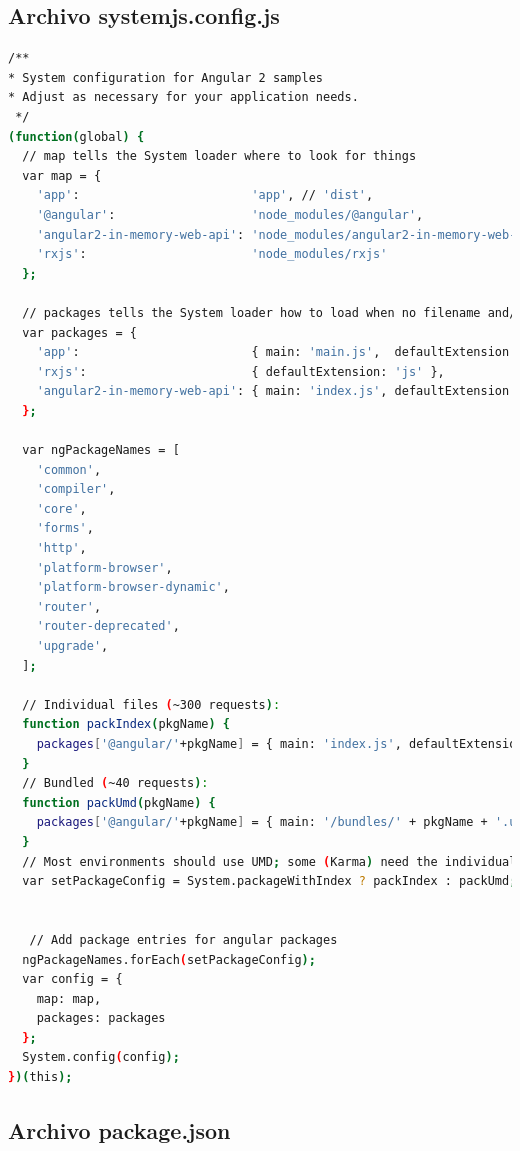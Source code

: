 \documentclass[12pt,twoside]{book}
\begin{document}
\subsection{Archivo systemjs.config.js}

\begin{lstlisting}[language=bash]
/**
* System configuration for Angular 2 samples
* Adjust as necessary for your application needs.
 */
(function(global) {
  // map tells the System loader where to look for things
  var map = {
    'app':                        'app', // 'dist',
    '@angular':                   'node_modules/@angular',
    'angular2-in-memory-web-api': 'node_modules/angular2-in-memory-web-api',
    'rxjs':                       'node_modules/rxjs'
  };
  
  // packages tells the System loader how to load when no filename and/or no extension
  var packages = {
    'app':                        { main: 'main.js',  defaultExtension: 'js' },
    'rxjs':                       { defaultExtension: 'js' },
    'angular2-in-memory-web-api': { main: 'index.js', defaultExtension: 'js' },
  };
  
  var ngPackageNames = [
    'common',
    'compiler',
    'core',
    'forms',
    'http',
    'platform-browser',
    'platform-browser-dynamic',
    'router',
    'router-deprecated',
    'upgrade',
  ];
  
  // Individual files (~300 requests):
  function packIndex(pkgName) {
    packages['@angular/'+pkgName] = { main: 'index.js', defaultExtension: 'js' };
  }
  // Bundled (~40 requests):
  function packUmd(pkgName) {
    packages['@angular/'+pkgName] = { main: '/bundles/' + pkgName + '.umd.js', defaultExtension: 'js' };
  }
  // Most environments should use UMD; some (Karma) need the individual index files
  var setPackageConfig = System.packageWithIndex ? packIndex : packUmd;


   // Add package entries for angular packages
  ngPackageNames.forEach(setPackageConfig);
  var config = {
    map: map,
    packages: packages
  };
  System.config(config);
})(this);  

\end{lstlisting}

\subsection{Archivo package.json}
\label{seccion:package}
\end{document}
